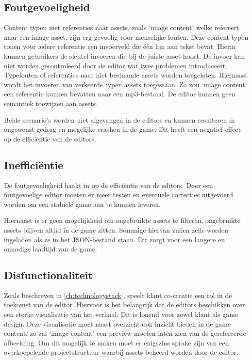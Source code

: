 \subsection{Foutgevoeligheid}
Content typen met referenties naar assets, zoals ‘image content’ welke refereert naar een image asset, zijn erg gevoelig voor menselijke fouten. Deze content typen tonen voor iedere referentie een invoerveld die één lijn aan tekst bevat. Hierin kunnen gebruikers de sleutel invoeren die bij de juiste asset hoort. De invoer kan niet worden gecontroleerd door de editor wat twee problemen introduceert. Typefouten of referenties naar niet bestaande assets worden toegelaten. Hiernaast wordt het invoeren van verkeerde typen assets toegestaan. Zo zou ‘image content’ een referentie kunnen bevatten naar een mp3-bestand. De editor kunnen geen semantiek toewijzen aan assets.

Beide scenario’s worden niet afgevangen in de editors en kunnen resulteren in ongewenst gedrag en mogelijke crashen in de game. Dit heeft een negatief effect op de efficiëntie van de editors.

\subsection{Inefficiëntie}
De foutgevoeligheid haakt in op de efficiëntie van de editors. Door een foutgevoelige editor moeten er meer testen en eventuele correcties uitgevoerd worden om een stabiele game aan te kunnen leveren.

Hiernaast is er geen mogelijkheid om ongebruikte assets te filteren, ongebruikte assets blijven altijd in de game zitten. Sommige hiervan zullen zelfs worden ingeladen als ze in het JSON-bestand staan. Dit zorgt voor een langere en onnodige laadtijd van de game.

\subsection{Disfunctionaliteit}
Zoals beschreven in \autoref{ch:technologystack}, speelt klant co-creatie een rol in de toekomst van de editor. Hiervoor is het belangrijk dat de editors beschikken over een sterke visualisatie van het verhaal\cite{Schipper2015}. Dit is lonend voor zowel klant als game design. Deze visualisatie moet naast overzicht ook inzicht bieden in de game content, zo zal ‘image content’ een preview moeten laten zien van de gerefereerde afbeelding. Om dit mogelijk te maken moet er enigszins sprake zijn van een overkoepelende projectstructuur waarbij assets beheerd worden door de editor.

